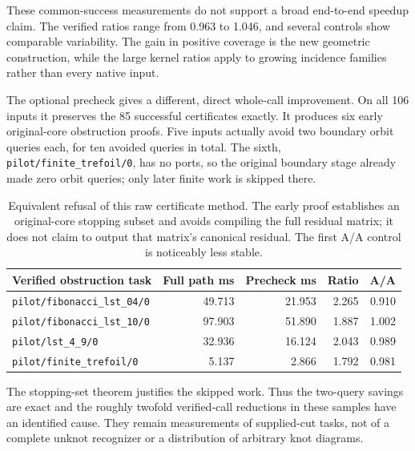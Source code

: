 These common-success measurements do not support a broad end-to-end speedup
claim.  The verified ratios range from 0.963 to 1.046, and several controls
show comparable variability.  The gain in positive coverage is the new
geometric construction, while the large kernel ratios apply to growing
incidence families rather than every native input.

The optional precheck gives a different, direct whole-call improvement.
On all 106 inputs it preserves the 85 successful certificates exactly.
It produces six early original-core obstruction proofs.  Five inputs
actually avoid two boundary orbit queries each, for ten avoided queries
in total.  The sixth, \texttt{pilot/finite\_trefoil/0}, has no ports, so
the original boundary stage already made zero orbit queries; only later
finite work is skipped there.

\begin{table}[htbp]
\centering\small
\begin{tabularx}{\linewidth}{@{}Yrrrr@{}}
\toprule
Verified obstruction task & Full path ms & Precheck ms & Ratio & A/A\\
\midrule
\texttt{pilot/fibonacci\_lst\_04/0} & 49.713 & 21.953 & 2.265 & 0.910\\
\texttt{pilot/fibonacci\_lst\_10/0} & 97.903 & 51.890 & 1.887 & 1.002\\
\texttt{pilot/lst\_4\_9/0} & 32.936 & 16.124 & 2.043 & 0.989\\
\texttt{pilot/finite\_trefoil/0} & 5.137 & 2.866 & 1.792 & 0.981\\
\bottomrule
\end{tabularx}
\caption{Equivalent refusal of this raw certificate method.  The early
proof establishes an original-core stopping subset and avoids compiling
the full residual matrix; it does not claim to output that matrix's
canonical residual.  The first A/A control is noticeably less stable.}
\end{table}

The stopping-set theorem justifies the skipped work.  Thus the two-query
savings are exact and the roughly twofold verified-call reductions in
these samples have an identified cause.  They remain measurements of
supplied-cut tasks, not of a complete unknot recognizer or a distribution
of arbitrary knot diagrams.
